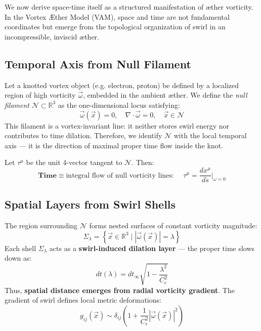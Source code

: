 \documentclass[12pt]{article}
\begin{document}
    We now derive space-time itself as a structured manifestation of æther vorticity. In the Vortex \AE ther Model (VAM), space and time are not fundamental coordinates but emerge from the topological organization of swirl in an incompressible, inviscid æther.

    \subsection{Temporal Axis from Null Filament}
    \label{subsec:null_filament_time}

    Let a knotted vortex object (e.g. electron, proton) be defined by a localized region of high vorticity \( \vec{\omega} \), embedded in the ambient æther. We define the \textit{null filament} \( \mathcal{N} \subset \mathbb{R}^3 \) as the one-dimensional locus satisfying:
    \begin{equation}
        \vec{\omega}(\vec{x}) = 0, \quad \nabla \cdot \vec{\omega} = 0, \quad \vec{x} \in \mathcal{N}
    \end{equation}
    This filament is a vortex-invariant line: it neither stores swirl energy nor contributes to time dilation. Therefore, we identify \( \mathcal{N} \) with the local temporal axis — it is the direction of maximal proper time flow inside the knot.

    Let \( \tau^\mu \) be the unit 4-vector tangent to \( \mathcal{N} \). Then:
    \begin{equation}
        \boxed{
            \textbf{Time} \equiv \text{integral flow of null vorticity lines: }
            \quad \tau^\mu = \frac{dx^\mu}{ds} \Big|_{\omega = 0}
        }
    \end{equation}

    \subsection{Spatial Layers from Swirl Shells}
    \label{subsec:swirl_shells_space}

    The region surrounding \( \mathcal{N} \) forms nested surfaces of constant vorticity magnitude:
    \[
        \Sigma_\lambda = \left\{ \vec{x} \in \mathbb{R}^3 \mid |\vec{\omega}(\vec{x})| = \lambda \right\}
    \]
    Each shell \( \Sigma_\lambda \) acts as a \textbf{swirl-induced dilation layer} — the proper time slows down as:
    \[
        dt(\lambda) = dt_\infty \sqrt{1 - \frac{\lambda^2}{C_e^2}}
    \]
    Thus, \textbf{spatial distance emerges from radial vorticity gradient}. The gradient of swirl defines local metric deformations:
    \begin{equation}
        g_{ij}(\vec{x}) \sim \delta_{ij} \left( 1 + \frac{1}{C_e^2} |\vec{\omega}(\vec{x})|^2 \right)
    \end{equation}
\end{document}
